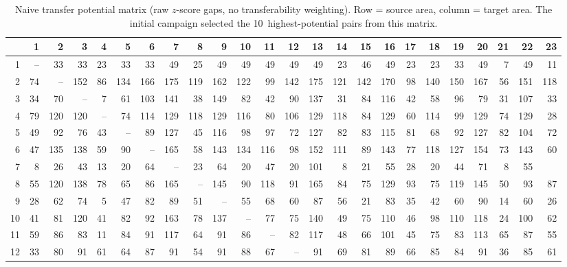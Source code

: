 \documentclass[11pt]{article}
\theoremstyle{definition}
\theoremstyle{remark}
\begin{document}
\begin{landscape}
\begin{table}[p]
\centering
\caption{Naive transfer potential matrix (raw $z$-score gaps, no transferability weighting).
  Row = source area, column = target area.  The initial campaign selected the
  10~highest-potential pairs from this matrix.}
\label{tab:naive_matrix}
\setlength{\tabcolsep}{2.5pt}
{\fontsize{5.5}{7}\selectfont
\begin{tabular}{@{}r|rrrrrrrrrrrrrrrrrrrrrrr@{}}
\toprule
& 1 & 2 & 3 & 4 & 5 & 6 & 7 & 8 & 9 & 10 & 11 & 12 & 13 & 14 & 15 & 16 & 17 & 18 & 19 & 20 & 21 & 22 & 23 \\
\midrule
1 & -- & 33 & 33 & 23 & 33 & 33 & 49 & 25 & 49 & 49 & 49 & 49 & 49 & 23 & 46 & 49 & 23 & 23 & 33 & 49 & 7 & 49 & 11 \\
2 & 74 & -- & 152 & 86 & 134 & 166 & 175 & 119 & 162 & 122 & 99 & 142 & 175 & 121 & 142 & 170 & 98 & 140 & 150 & 167 & 56 & 151 & 118 \\
3 & 34 & 70 & -- & 7 & 61 & 103 & 141 & 38 & 149 & 82 & 42 & 90 & 137 & 31 & 84 & 116 & 42 & 58 & 96 & 79 & 31 & 107 & 33 \\
4 & 79 & 120 & 120 & -- & 74 & 114 & 129 & 118 & 129 & 116 & 80 & 106 & 129 & 118 & 84 & 129 & 60 & 114 & 99 & 129 & 74 & 129 & 28 \\
5 & 49 & 92 & 76 & 43 & -- & 89 & 127 & 45 & 116 & 98 & 97 & 72 & 127 & 82 & 83 & 115 & 81 & 68 & 92 & 127 & 82 & 104 & 72 \\
6 & 47 & 135 & 138 & 59 & 90 & -- & 165 & 58 & 143 & 134 & 116 & 98 & 152 & 111 & 89 & 143 & 77 & 118 & 127 & 154 & 73 & 143 & 60 \\
7 & 8 & 26 & 43 & 13 & 20 & 64 & -- & 23 & 64 & 20 & 47 & 20 & 101 & 8 & 21 & 55 & 28 & 20 & 44 & 71 & 8 & 55 & \\
8 & 55 & 120 & 138 & 78 & 65 & 86 & 165 & -- & 145 & 90 & 118 & 91 & 165 & 84 & 75 & 129 & 93 & 75 & 119 & 145 & 50 & 93 & 87 \\
9 & 28 & 62 & 74 & 5 & 47 & 82 & 89 & 51 & -- & 55 & 68 & 60 & 87 & 56 & 21 & 83 & 35 & 42 & 60 & 90 & 14 & 60 & 26 \\
10 & 41 & 81 & 120 & 41 & 82 & 92 & 163 & 78 & 137 & -- & 77 & 75 & 140 & 49 & 75 & 110 & 46 & 98 & 110 & 118 & 24 & 100 & 62 \\
11 & 59 & 86 & 83 & 11 & 84 & 91 & 117 & 64 & 91 & 86 & -- & 82 & 117 & 48 & 66 & 101 & 45 & 75 & 83 & 113 & 65 & 87 & 55 \\
12 & 33 & 80 & 91 & 61 & 64 & 87 & 91 & 54 & 91 & 88 & 67 & -- & 91 & 69 & 81 & 89 & 66 & 85 & 84 & 91 & 36 & 85 & 61 \\

\end{tabular}}
\end{table}
\end{landscape}
\end{document}
